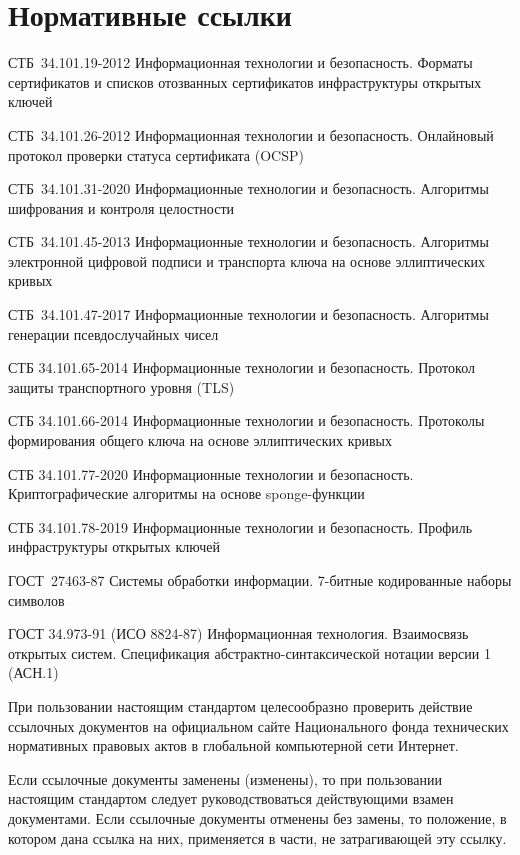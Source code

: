 \chapter{Нормативные ссылки}\label{REFS}

СТБ~34.101.19-2012 Информационная технологии и безопасность. Форматы 
сертификатов и списков отозванных сертификатов инфраструктуры открытых 
ключей 

СТБ~34.101.26-2012 Информационная технологии и безопасность. Онлайновый 
протокол проверки статуса сертификата (OCSP)

СТБ~34.101.31-2020 Информационные технологии и безопасность. Алгоритмы 
шифрования и контроля целостности

СТБ~34.101.45-2013 Информационные технологии и безопасность. Алгоритмы  
электронной цифровой подписи и транспорта ключа на основе эллиптических 
кривых 

СТБ~34.101.47-2017 Информационные технологии и безопасность. Алгоритмы 
генерации псевдослучайных чисел

СТБ 34.101.65-2014 Информационные технологии и безопасность. 
Протокол защиты транспортного уровня (TLS)

СТБ 34.101.66-2014 Информационные технологии и безопасность. 
Протоколы формирования общего ключа на основе эллиптических кривых

СТБ 34.101.77-2020 Информационные технологии и безопасность. 
Криптографические алгоритмы на основе sponge-функции

СТБ 34.101.78-2019 Информационные технологии и безопасность. 
Профиль инфраструктуры открытых ключей

ГОСТ~27463-87 Системы обработки информации. 7-битные кодированные наборы 
символов

ГОСТ 34.973-91 (ИСО 8824-87) Информационная технология. Взаимосвязь 
открытых систем. Спецификация абстрактно-синтаксической нотации версии 1 
(АСН.1) 

\begin{note*}
При пользовании настоящим стандартом целесообразно проверить действие
ссылочных документов на официальном сайте Национального фонда
технических нормативных правовых актов в глобальной компьютерной сети Интернет.

Если ссылочные документы заменены (изменены), то при пользовании настоящим
стандартом следует руководствоваться действующими взамен документами. Если
ссылочные документы отменены без замены, то положение, в котором дана ссылка на
них, применяется в части, не затрагивающей эту ссылку.
\end{note*}

